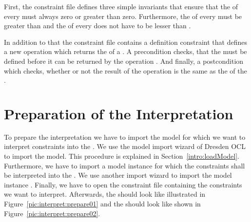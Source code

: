 First, the constraint file defines three simple invariants that ensure that 
the  of every  must always zero or greater than zero. 
Furthermore, the  of every  must be greater than
 and the  of every  does not have to be
lesser than .

In addition to that the constraint file contains a definition constraint that 
defines a new operation  which returns the  of a 
. A precondition checks, that the  must be defined 
before it can be returned by the operation . And finally, a 
postcondition which checks, whether or not the result of the operation 
 is the same as the  of the .



\section{Preparation of the Interpretation}

To prepare the interpretation we have to import the model 
 for which we want to interpret constraints into the
. We use the model import wizard of Dresden OCL to import
the model. This procedure is explained in Section~\ref{intro:loadModel}. 
Furthermore, we have to import a model instance for which the constraints shall 
be interpreted into the . We use another import 
wizard to import the model instance 
.
Finally, we have to open the constraint file 
containing the constraints we want to interpret. Afterwards, the  should look like illustrated in Figure~\ref{pic:interpret:prepare01} 
and the  should look like shown in 
Figure~\ref{pic:interpret:prepare02}.

